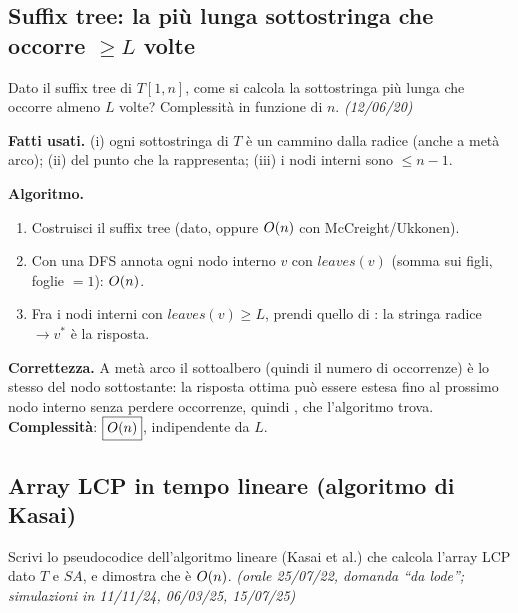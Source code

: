\subsection*{ Suffix tree: la pi\`u lunga sottostringa che occorre $\ge L$ volte}

\begin{domanda}
Dato il suffix tree di $T[1,n]$, come si calcola la sottostringa pi\`u lunga che occorre almeno
$L$ volte? Complessit\`a in funzione di $n$. \emph{(12/06/20)}
\end{domanda}

\textbf{Fatti usati.} (i) ogni sottostringa di $T$ \`e un cammino dalla radice (anche a met\`a
arco); (ii) 
del punto che la rappresenta; (iii) i nodi interni sono $\le n-1$.

\textbf{Algoritmo.}
\begin{enumerate}[leftmargin=1.8em,itemsep=1pt]
\item Costruisci il suffix tree (dato, oppure $O\!\left(n\right)$ con McCreight/Ukkonen).
\item Con una DFS annota ogni nodo interno $v$ con $\mathit{leaves}(v)$ (somma sui figli, foglie
$=1$): $O\!\left(n\right)$.
\item Fra i nodi interni con $\mathit{leaves}(v)\ge L$, prendi quello di : la stringa radice$\to v^{*}$ \`e la risposta.
\end{enumerate}

\textbf{Correttezza.} A met\`a arco il sottoalbero (quindi il numero di occorrenze) \`e lo stesso
del nodo sottostante: la risposta ottima pu\`o essere estesa fino al prossimo nodo interno senza
perdere occorrenze, quindi , che l'algoritmo trova.
\textbf{Complessit\`a}: $\boxed{O\!\left(n\right)}$, indipendente da $L$.

\subsection*{ Array LCP in tempo lineare (algoritmo di Kasai)}

\begin{domanda}
Scrivi lo pseudocodice dell'algoritmo lineare (Kasai et al.) che calcola l'array LCP dato $T$ e
$SA$, e dimostra che \`e $O\!\left(n\right)$. \emph{(orale 25/07/22, domanda ``da lode''; simulazioni in
11/11/24, 06/03/25, 15/07/25)}
\end{domanda}

